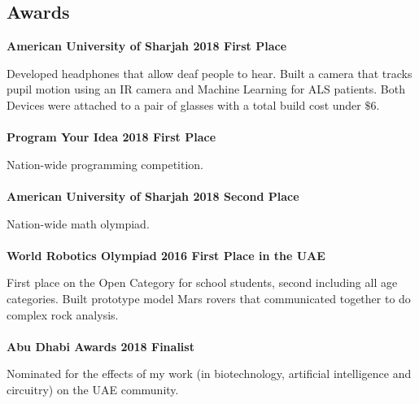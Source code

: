 \documentclass[12pt]{article}
\newcommand{\beginTheSection}[2]{
    \begin{adjustwidth}{20mm}{0mm}
    \section{\textcolor{main-color}{#1}}
    #2
    \end{adjustwidth}
}
\newcommand{\createHeading}[3]{

    \Large
    \bfseries
    #1
    \small
    \normalfont
    \hspace{3 mm} #3
    \vspace{1 mm}
    \newline
    \normalsize
    \bfseries
    #2
    \vspace{2 mm}\\

    \normalsize
    \normalfont
    
}
\begin{document}
\beginTheSection{Awards}{

    \createHeading{American University of Sharjah}{First Place}{2018}

    Developed headphones that allow deaf people to hear. Built a camera that tracks pupil motion using an IR camera and Machine Learning for ALS patients. Both Devices were attached to a pair of glasses with a total build cost under $\$ 6$.\\ \\

    \createHeading{Program Your Idea}{First Place}{2018}

    Nation-wide programming competition.\\ \\

    \createHeading{American University of Sharjah}{Second Place}{2018}

    Nation-wide math olympiad.\\ \\

    \createHeading{World Robotics Olympiad}{First Place in the UAE}{2016}

    First place on the Open Category for school students, second including all age categories. Built prototype model Mars rovers that communicated together to do complex rock analysis.\\ \\

    \createHeading{Abu Dhabi Awards}{Finalist}{2018}

    Nominated for the effects of my work (in biotechnology, artificial intelligence and circuitry) on the UAE community.\\ \\

}
\end{document}
